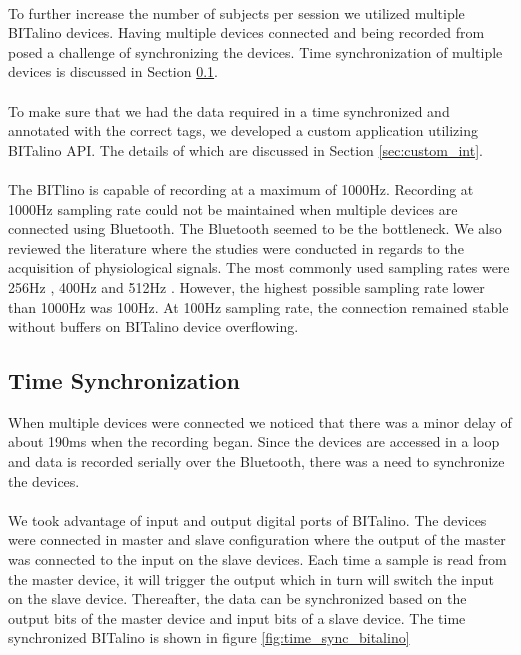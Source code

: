 \paragraph{}
To further increase the number of subjects per session we utilized multiple BITalino devices. Having multiple devices connected and being recorded from posed a challenge of synchronizing the devices. Time synchronization of multiple devices is discussed in Section \ref{sec:time_sync}.
\paragraph{}
To make sure that we had the data required in a time synchronized and annotated with the correct tags, we developed a custom application utilizing BITalino API. The details of which are discussed in Section \ref{sec:custom_int}.
\paragraph{}
The BITlino is capable of recording at a maximum of 1000Hz. Recording at 1000Hz sampling rate could not be maintained when multiple devices are connected using Bluetooth. The Bluetooth seemed to be the bottleneck. We also reviewed the literature where the studies were conducted in regards to the acquisition of physiological signals. The most commonly used sampling rates were 256Hz \cite{kim_emotion_2004} \cite{kim_emotion_2008}, 400Hz \cite{w_wen_2014} and 512Hz \cite{koelstra_deap:_2012}. However, the highest possible sampling rate lower than 1000Hz was 100Hz. At 100Hz sampling rate, the connection remained stable without buffers on BITalino device overflowing.

\subsection{Time Synchronization}
\label{sec:time_sync}
When multiple devices were connected we noticed that there was a minor delay of about 190ms when the recording began. Since the devices are accessed in a loop and data is recorded serially over the Bluetooth, there was a need to synchronize the devices.
\paragraph{}
We took advantage of input and output digital ports of BITalino. The devices were connected in master and slave configuration where the output of the master was connected to the input on the slave devices. Each time a sample is read from the master device, it will trigger the output which in turn will switch the input on the slave device. Thereafter, the data can be synchronized based on the output bits of the master device and input bits of a slave device. The time synchronized BITalino is shown in figure \ref{fig:time_sync_bitalino}

